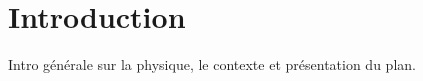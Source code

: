\makeatletter
\def\toclevel@chapter{-1}
\makeatother

\chapter*{Introduction}

Intro générale sur la physique, le contexte et présentation du plan.


\makeatletter
\def\toclevel@chapter{0}
\makeatother